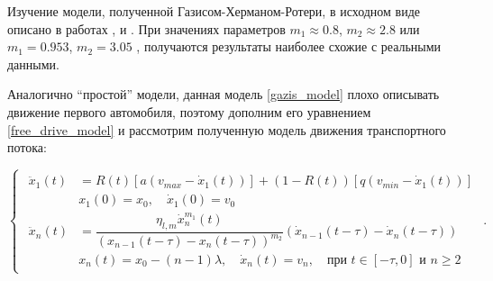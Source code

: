\documentclass[12pt, a4paper]{extarticle}
\numberwithin{equation}{section}
\numberwithin{figure}{section}
\begin{document}
Изучение модели, полученной Газисом-Херманом-Ротери, в исходном виде описано в работах \cite{StudyingGazisModel_1},  \cite{StudyingGazisModel_2} и  \cite{StudyingGazisModel_3}. При значениях параметров $m_1 \approx 0.8$, $m_2 \approx 2.8$ \cite{StudyingGazisModel_1} или $m_1 = 0.953$, $m_2 = 3.05$ \cite{StudyingGazisModel_2}, \cite{StudyingGazisModel_3} получаются результаты наиболее схожие с реальными данными.

Аналогично ``простой'' модели, данная модель \eqref{gazis_model} плохо описывать движение первого автомобиля, поэтому дополним его уравнением \eqref{free_drive_model} и рассмотрим полученную модель движения транспортного потока:

\begin{equation} \label{full_gazis_model}
\begin{cases}
\begin{split}
\ddot{x}_1(t)& = R(t) \left[ a\left(v_{max}-\dot{x}_1(t) \right)\right] + (1-R(t)) \left[ q\left( v_{min} - \dot{x}_1(t)\right) \right] \\
&x_{1}(0)=x_0, \quad \dot{x}_{1}(0)=v_{0}\\
\ddot{x}_n(t)& = \dfrac{\eta_{l,m}\dot{x}_n^{m_1}(t)}{(x_{n-1}(t-\tau)-x_n(t-\tau))^{m_2}} (\dot{x}_{n-1}(t-\tau) - \dot{x}_{n}(t-\tau)) \\
&x_n(t)=x_0-(n-1)\lambda, \quad \dot{x}_n(t)=v_{n}, \quad \text{при } t \in [-\tau,0] \text{ и } n\geq2
\end{split}
\end{cases}.
\end{equation}
\end{document}
